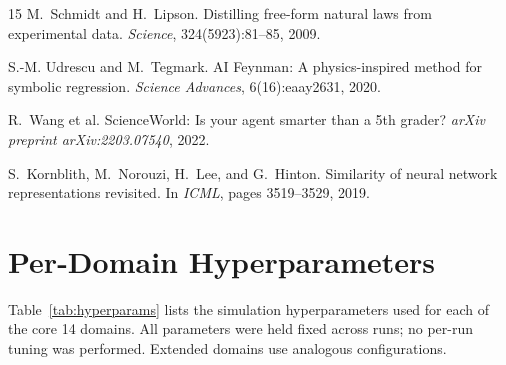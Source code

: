 \documentclass{article}
\begin{document}
\begin{thebibliography}{15}
M.~Schmidt and H.~Lipson.
\newblock Distilling free-form natural laws from experimental data.
\newblock \emph{Science}, 324(5923):81--85, 2009.

S.-M. Udrescu and M.~Tegmark.
\newblock AI Feynman: A physics-inspired method for symbolic regression.
\newblock \emph{Science Advances}, 6(16):eaay2631, 2020.

R.~Wang et al.
\newblock ScienceWorld: Is your agent smarter than a 5th grader?
\newblock \emph{arXiv preprint arXiv:2203.07540}, 2022.

S.~Kornblith, M.~Norouzi, H.~Lee, and G.~Hinton.
\newblock Similarity of neural network representations revisited.
\newblock In \emph{ICML}, pages 3519--3529, 2019.

\end{thebibliography}

\appendix

\section{Per-Domain Hyperparameters}
\label{app:hyperparams}

Table~\ref{tab:hyperparams} lists the simulation hyperparameters used for each
of the core 14 domains. All parameters were held fixed across runs; no per-run
tuning was performed. Extended domains use analogous configurations.
\end{document}
